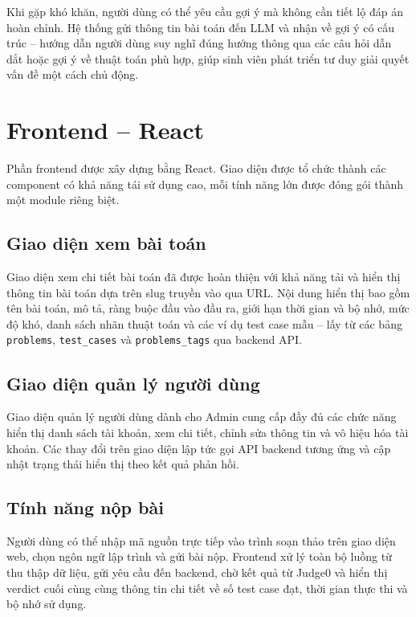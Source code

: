 \documentclass[12pt, a4paper]{report}
\begin{document}
Khi gặp khó khăn, người dùng có thể yêu cầu gợi ý mà không cần tiết lộ đáp án hoàn chỉnh. Hệ thống gửi thông tin bài toán đến \ac{LLM} và nhận về gợi ý có cấu trúc -- hướng dẫn người dùng suy nghĩ đúng hướng thông qua các câu hỏi dẫn dắt hoặc gợi ý về thuật toán phù hợp, giúp sinh viên phát triển tư duy giải quyết vấn đề một cách chủ động.

\section{Frontend -- React}

Phần frontend được xây dựng bằng React. Giao diện được tổ chức thành các component có khả năng tái sử dụng cao, mỗi tính năng lớn được đóng gói thành một module riêng biệt.

\subsection{Giao diện xem bài toán}

Giao diện xem chi tiết bài toán đã được hoàn thiện với khả năng tải và hiển thị thông tin bài toán dựa trên slug truyền vào qua URL. Nội dung hiển thị bao gồm tên bài toán, mô tả, ràng buộc đầu vào đầu ra, giới hạn thời gian và bộ nhớ, mức độ khó, danh sách nhãn thuật toán và các ví dụ test case mẫu -- lấy từ các bảng \texttt{problems}, \texttt{test\_cases} và \texttt{problems\_tags} qua backend \ac{API}.

\subsection{Giao diện quản lý người dùng}

Giao diện quản lý người dùng dành cho Admin cung cấp đầy đủ các chức năng hiển thị danh sách tài khoản, xem chi tiết, chỉnh sửa thông tin và vô hiệu hóa tài khoản. Các thay đổi trên giao diện lập tức gọi \ac{API} backend tương ứng và cập nhật trạng thái hiển thị theo kết quả phản hồi.

\subsection{Tính năng nộp bài}

Người dùng có thể nhập mã nguồn trực tiếp vào trình soạn thảo trên giao diện web, chọn ngôn ngữ lập trình và gửi bài nộp. Frontend xử lý toàn bộ luồng từ thu thập dữ liệu, gửi yêu cầu đến backend, chờ kết quả từ Judge0 và hiển thị verdict cuối cùng cùng thông tin chi tiết về số test case đạt, thời gian thực thi và bộ nhớ sử dụng.
\end{document}
